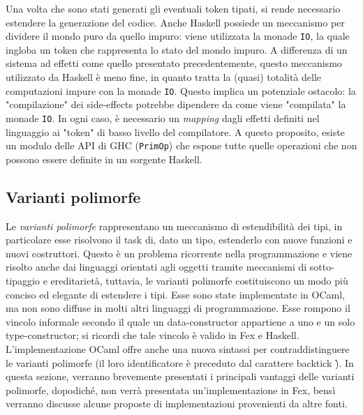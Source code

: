 \documentclass[10pt,a4paper]{article}
\begin{document}
Una volta che sono stati generati gli eventuali token tipati, si rende necessario estendere la generazione del codice.
Anche Haskell possiede un meccanismo per dividere il mondo puro da quello impuro: viene utilizzata la monade \texttt{IO},
la quale ingloba un token che rappresenta lo stato del mondo impuro. A differenza di un sistema ad effetti come quello
presentato precedentemente, questo meccanismo utilizzato da Haskell è meno fine, in quanto tratta la (quasi) totalità
delle computazioni impure con la monade \texttt{IO}. Questo implica un potenziale ostacolo: la "compilazione" dei
side-effects potrebbe dipendere da come viene "compilata" la monade \texttt{IO}. In ogni caso, è necessario un
\textit{mapping}
dagli effetti definiti nel linguaggio ai "token" di basso livello del compilatore. A questo proposito, esiste un
modulo delle API di GHC (\texttt{PrimOp}) che espone tutte quelle operazioni che non possono essere definite in un
sorgente Haskell.

\hypertarget{Varianti polimorfe}{\subsection{Varianti polimorfe}}
Le \textit{varianti polimorfe} rappresentano un meccanismo di estendibilità dei tipi, in particolare esse risolvono
il task di, dato un tipo, estenderlo con nuove funzioni e nuovi costruttori. Questo è un problema ricorrente nella
programmazione e viene risolto anche dai linguaggi orientati agli oggetti tramite meccanismi di sotto-tipaggio e
ereditarietà, tuttavia, le varianti polimorfe costituiscono un modo più conciso ed elegante di estendere i tipi.
Esse sono state implementate in OCaml, ma non sono diffuse in molti altri linguaggi di programmazione. Esse rompono
il vincolo informale secondo il quale un data-constructor appartiene a uno e un solo type-constructor; si ricordi che
tale vincolo è valido in Fex e Haskell. L'implementazione OCaml offre anche una nuova sintassi per contraddistinguere
le varianti polimorfe (il loro identificatore è preceduto dal carattere backtick \`).
In questa sezione, verranno brevemente presentati i principali vantaggi delle varianti polimorfe, dopodiché, non verrà
presentata un'implementazione in Fex, bensì verranno discusse alcune proposte di implementazioni provenienti da
altre fonti.
\end{document}
